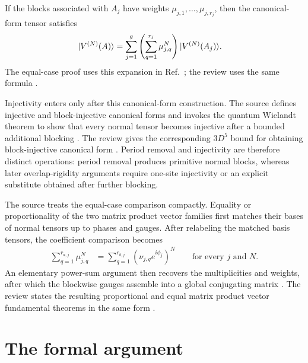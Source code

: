 \documentclass{article}
\begin{document}
If the blocks associated with $A_j$ have weights
$\mu_{j,1},\ldots,\mu_{j,r_j}$, then the canonical-form tensor satisfies
\begin{align}
    |V^{(N)}(A)\rangle
        &=
        \sum_{j=1}^{g}
        \left(\sum_{q=1}^{r_j}\mu_{j,q}^{N}\right)
        |V^{(N)}(A_j)\rangle.
    \label{eq:rmp_common_blocking_span_equality_bnt_expansion}
\end{align}
The equal-case proof uses this expansion in
Ref.~\cite[lines~283--302]{Cirac2016MPDO_arXiv}; the review uses the same
formula \cite[lines~1864--1885]{Cirac2021Matrix}.

Injectivity enters only after this canonical-form construction. The source
defines injective and block-injective canonical forms and invokes the quantum
Wielandt theorem to show that every normal tensor becomes injective after a
bounded additional blocking
\cite[lines~317--332]{Cirac2016MPDO_arXiv}. The review gives the corresponding
$3D^5$ bound for obtaining block-injective canonical form
\cite[lines~2120--2124]{Cirac2021Matrix}. Period removal and injectivity are
therefore distinct operations: period removal produces primitive normal blocks,
whereas later overlap-rigidity arguments require one-site injectivity or an
explicit substitute obtained after further blocking.

The source treats the equal-case comparison compactly. Equality or
proportionality of the two matrix product vector families first matches their
bases of normal tensors up to phases and gauges. After relabeling the matched
basis tensors, the coefficient comparison becomes
\begin{align}
    \sum_{q=1}^{r_{a,j}}\mu_{j,q}^{N}
        &=
        \sum_{q=1}^{r_{b,j}}
        \left(\nu_{j,q}e^{i\phi_j}\right)^{N}
        \qquad
        \text{for every $j$ and $N$}.
    \label{eq:rmp_common_blocking_span_equality_power_sum_comparison}
\end{align}
An elementary power-sum argument then recovers the multiplicities and weights,
after which the blockwise gauges assemble into a global conjugating matrix
\cite[lines~1181--1192]{Cirac2016MPDO_arXiv}. The review states the resulting
proportional and equal matrix product vector fundamental theorems in the same
form \cite[lines~1891--1900]{Cirac2021Matrix}.

\section{The formal argument}
\end{document}

